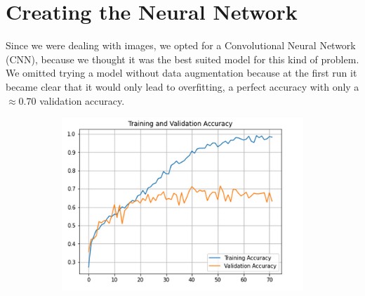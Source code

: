 \documentclass[a4paper,12pt]{article}
\numberwithin{equation}{section}
\begin{document}
\section*{Creating the Neural Network}
Since we were dealing with images, we opted for a Convolutional Neural Network (CNN), because we thought it was the best suited model for this kind of problem. We omitted trying a model without data augmentation because at the first run it became clear that it would only lead to overfitting, a perfect accuracy with only a \(\approx 0.70\) validation accuracy. 
\begin{figure}
      \begin{subfigure}{0.5\textwidth}

      \includegraphics[scale=0.5]{model_noaug_acc.png}  
      \end{subfigure}
      \begin{subfigure}{0.4\textwidth}

\end{subfigure}
\end{figure}
\end{document}
